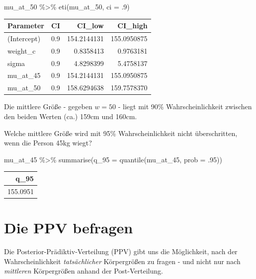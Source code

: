 \documentclass[
  a4paper,
  DIV=11]{scrreprt}
\newenvironment{Shaded}{\begin{snugshade}}{\end{snugshade}}
\newcommand{\AttributeTok}[1]{\textcolor[rgb]{0.40,0.45,0.13}{#1}}
\newcommand{\DecValTok}[1]{\textcolor[rgb]{0.68,0.00,0.00}{#1}}
\newcommand{\FunctionTok}[1]{\textcolor[rgb]{0.28,0.35,0.67}{#1}}
\newcommand{\NormalTok}[1]{\textcolor[rgb]{0.00,0.23,0.31}{#1}}
\newcommand{\SpecialCharTok}[1]{\textcolor[rgb]{0.37,0.37,0.37}{#1}}
\theoremstyle{definition}
\theoremstyle{remark}
\begin{document}
\begin{Shaded}
\begin{Highlighting}[]
\NormalTok{mu\_at\_50 }\SpecialCharTok{\%\textgreater{}\%} 
  \FunctionTok{eti}\NormalTok{(mu\_at\_50, }\AttributeTok{ci =}\NormalTok{ .}\DecValTok{9}\NormalTok{)}
\end{Highlighting}
\end{Shaded}

\begin{longtable}[]{@{}lrrr@{}}
\toprule()
Parameter & CI & CI\_low & CI\_high \\
\midrule()
\endhead
(Intercept) & 0.9 & 154.2144131 & 155.0950875 \\
weight\_c & 0.9 & 0.8358413 & 0.9763181 \\
sigma & 0.9 & 4.8298399 & 5.4758137 \\
mu\_at\_45 & 0.9 & 154.2144131 & 155.0950875 \\
mu\_at\_50 & 0.9 & 158.6294638 & 159.7578370 \\
\bottomrule()
\end{longtable}

Die mittlere Größe - gegeben \(w=50\) - liegt mit 90\%
Wahrscheinlichkeit zwischen den beiden Werten (ca.) 159cm und 160cm.

Welche mittlere Größe wird mit 95\% Wahrscheinlichkeit nicht
überschritten, wenn die Person 45kg wiegt?

\begin{Shaded}
\begin{Highlighting}[]
\NormalTok{mu\_at\_45 }\SpecialCharTok{\%\textgreater{}\%} 
  \FunctionTok{summarise}\NormalTok{(}\AttributeTok{q\_95 =} \FunctionTok{quantile}\NormalTok{(mu\_at\_45, }\AttributeTok{prob =}\NormalTok{ .}\DecValTok{95}\NormalTok{))}
\end{Highlighting}
\end{Shaded}

\begin{longtable}[]{@{}r@{}}
\toprule()
q\_95 \\
\midrule()
\endhead
155.0951 \\
\bottomrule()
\end{longtable}

\hypertarget{die-ppv-befragen}{%
\section{Die PPV befragen}\label{die-ppv-befragen}}

Die Posterior-Prädiktiv-Verteilung (PPV) gibt uns die Möglichkeit, nach
der Wahrscheinlichkeit \emph{tatsächlicher} Körpergrößen zu fragen - und
nicht nur nach \emph{mittleren} Körpergrößen anhand der Post-Verteilung.
\end{document}
